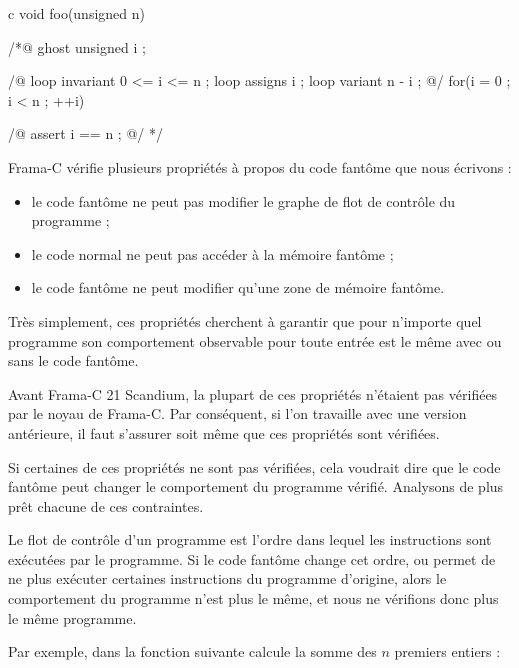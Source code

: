 \begin{CodeBlock}{c}
void foo(unsigned n){
 /*@ ghost
   unsigned i ;

   /@
     loop invariant 0 <= i <= n ;
     loop assigns i ;
     loop variant n - i ;
   @/
   for(i = 0 ; i < n ; ++i){

   }
   /@ assert i == n ; @/
 */
}
\end{CodeBlock}




Frama-C vérifie plusieurs propriétés à propos du code fantôme que nous écrivons :


\begin{itemize}
\item le code fantôme ne peut pas modifier le graphe de flot de contrôle
      du programme ;
\item le code normal ne peut pas accéder à la mémoire fantôme ;
\item le code fantôme ne peut modifier qu'une zone de mémoire fantôme.
\end{itemize}


Très simplement, ces propriétés cherchent à garantir que pour n'importe
quel programme son comportement observable pour toute entrée est le même
avec ou sans le code fantôme.


\begin{Warning}
  Avant Frama-C 21 Scandium, la plupart de ces propriétés n'étaient pas vérifiées
  par le noyau de Frama-C. Par conséquent, si l'on travaille avec une version
  antérieure, il faut s'assurer soit même que ces propriétés sont vérifiées.
\end{Warning}


Si certaines de ces propriétés ne sont pas vérifiées, cela voudrait dire que le
code fantôme peut changer le comportement du programme vérifié. Analysons de plus
prêt chacune de ces contraintes.




Le flot de contrôle d'un programme est l'ordre dans lequel les instructions sont
exécutées par le programme. Si le code fantôme change cet ordre, ou permet de ne
plus exécuter certaines instructions du programme d'origine, alors le comportement
du programme n'est plus le même, et nous ne vérifions donc plus le même programme.


Par exemple, dans la fonction suivante calcule la somme des $n$ premiers entiers :


